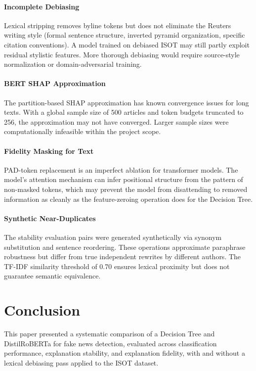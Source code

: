 \documentclass[journal,10pt,twocolumn]{IEEEtran}
\begin{document}
\paragraph{Incomplete Debiasing}
Lexical stripping removes byline tokens but does not eliminate the
Reuters writing style (formal sentence structure, inverted pyramid
organization, specific citation conventions).  A model trained on
debiased ISOT may still partly exploit residual stylistic features.
More thorough debiasing would require source-style normalization or
domain-adversarial training.

\paragraph{BERT SHAP Approximation}
The partition-based SHAP approximation has known convergence issues for
long texts.  With a global sample size of 500 articles and token budgets
truncated to 256, the approximation may not have converged.  Larger
sample sizes were computationally infeasible within the project scope.

\paragraph{Fidelity Masking for Text}
PAD-token replacement is an imperfect ablation for transformer models.
The model's attention mechanism can infer positional structure from the
pattern of non-masked tokens, which may prevent the model from
disattending to removed information as cleanly as the feature-zeroing
operation does for the Decision Tree.

\paragraph{Synthetic Near-Duplicates}
The stability evaluation pairs were generated synthetically via synonym
substitution and sentence reordering.  These operations approximate
paraphrase robustness but differ from true independent rewrites by
different authors.  The TF-IDF similarity threshold of 0.70 ensures
lexical proximity but does not guarantee semantic equivalence.

\section{Conclusion}
\label{sec:conclusion}

This paper presented a systematic comparison of a Decision Tree and
DistilRoBERTa for fake news detection, evaluated across classification
performance, explanation stability, and explanation fidelity, with and
without a lexical debiasing pass applied to the ISOT dataset.
\end{document}
